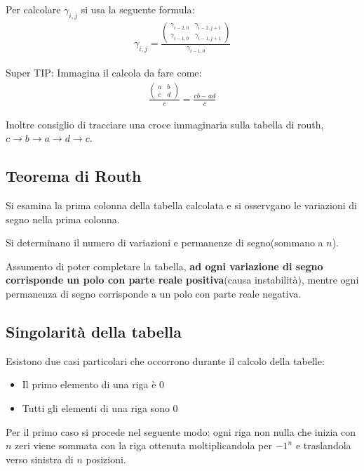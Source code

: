 Per calcolare $\gamma_{i,j}$ si usa la seguente formula:
\begin{align}
  \gamma_{i,j} = \frac{
    \begin{pmatrix}
      \gamma_{i-2, 0} & \gamma_{i-2, j+1} \\
      \gamma_{i-1, 0} & \gamma_{i-1, j+1}
    \end{pmatrix}
    }{\gamma_{i-1, 0}}
\end{align}

Super TIP: Immagina il calcola da fare come:
\begin{align}
  \frac{
    \begin{pmatrix}
      a & b \\
      c & d
    \end{pmatrix}
  }{c}
  =
  \frac{cb  - ad}{c}
\end{align}

Inoltre consiglio di tracciare una croce immaginaria sulla tabella di routh,
$c \rightarrow b \rightarrow a \rightarrow d \rightarrow c$.




\subsection{Teorema di Routh}
Si esamina la prima colonna della tabella calcolata e si osservgano le variazioni di segno nella prima colonna.

Si determinano il numero di variazioni e permanenze di segno(sommano a $n$).

Assumento di poter completare la tabella, \textbf{ad ogni variazione di segno corrisponde un polo con parte reale positiva}(causa instabilit\`a),
mentre ogni permanenza di segno corrisponde a un polo con parte reale negativa.


\subsection{Singolarit\`a della tabella}

Esistono due casi particolari che occorrono durante il calcolo della tabelle:
\begin{itemize}
  \item Il primo elemento di una riga \`e $0$
  \item Tutti gli elementi di una riga sono $0$
\end{itemize}

Per il primo caso si procede nel seguente modo:
ogni riga non nulla che inizia con $n$ zeri viene sommata con la riga ottenuta
moltiplicandola per $-1^n$ e traslandola verso sinistra di $n$ posizioni.


